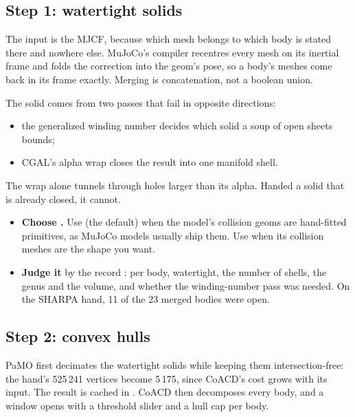 \subsection{Step 1: watertight solids}\label{sec:step1}

The input is the MJCF, because which mesh belongs to which body is stated there and nowhere else. MuJoCo's compiler recentres every mesh on its inertial frame and folds the correction into the geom's pose, so a body's meshes come back in its frame exactly. Merging is concatenation, not a boolean union.

The solid comes from two passes that fail in opposite directions:

\begin{itemize}
\item the generalized winding number \cite{winding} decides which solid a soup of open sheets bounds;
\item CGAL's alpha wrap \cite{alphawrap} closes the result into one manifold shell.
\end{itemize}

The wrap alone tunnels through holes larger than its alpha. Handed a solid that is already closed, it cannot.

\begin{itemize}
\item \textbf{Choose .} Use  (the default) when the model's collision geoms are hand-fitted primitives, as MuJoCo models usually ship them. Use  when its collision meshes are the shape you want.
\item \textbf{Judge it} by the record : per body, watertight, the number of shells, the genus and the volume, and whether the winding-number pass was needed. On the SHARPA hand, 11 of the 23 merged bodies were open.
\end{itemize}

\subsection{Step 2: convex hulls}\label{sec:step2}

PaMO \cite{pamo} first decimates the watertight solids while keeping them intersection-free: the hand's 525\,241 vertices become 5\,175, since CoACD's cost grows with its input. The result is cached in . CoACD \cite{coacd} then decomposes every body, and a window opens with a threshold slider and a hull cap per body.

